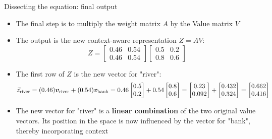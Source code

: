 \documentclass[aspectratio=169]{beamer}\usepackage[]{graphicx}\usepackage[]{xcolor}
\begin{document}
\begin{frame}{Dissecting the equation: final output}
\begin{itemize}
\item The final step is to multiply the weight matrix $A$ by the Value matrix $V$
\vfill
\item The output is the new context-aware representation $Z = AV$:
$$ Z = \begin{bmatrix} 0.46 & 0.54 \\ 0.46 & 0.54 \end{bmatrix} \begin{bmatrix} 0.5 & 0.2 \\ 0.8 & 0.6 \end{bmatrix} $$
\vfill
\item The first row of $Z$ is the new vector for "river":
  $$ \vec{z}_{\text{river}} = (0.46) \bm{v}_{\text{river}} + (0.54) \bm{v}_{\text{bank}} = 0.46 \begin{bmatrix} 0.5 \\ 0.2 \end{bmatrix} + 0.54 \begin{bmatrix} 0.8 \\ 0.6 \end{bmatrix} = \begin{bmatrix} 0.23 \\ 0.092 \end{bmatrix} + \begin{bmatrix} 0.432 \\ 0.324 \end{bmatrix} = \begin{bmatrix} 0.662 \\ 0.416 \end{bmatrix} $$
\vfill
\item The new vector for "river" is a \textbf{linear combination} of the two original value vectors. Its position in the space is now influenced by the vector for "bank", thereby incorporating context
\end{itemize}
\end{frame}
\end{document}
